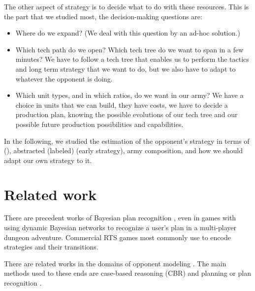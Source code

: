 The other aspect of strategy is to decide what to do with these resources. This is the part that we studied most, the decision-making questions are:
\begin{itemize}
    \item Where do we expand? (We deal with this question by an ad-hoc solution.)
    \item Which tech path do we open? Which tech tree do we want to span in a few minutes? We have to follow a tech tree that enables us to perform the tactics and long term strategy that we want to do, but we also have to adapt to whatever the opponent is doing.
    \item Which unit types, and in which ratios, do we want in our army? We have a choice in units that we can build, they have costs, we have to decide a production plan, knowing the possible evolutions of our tech tree and our possible future production possibilities and capabilities.
\end{itemize}

In the following, we studied the estimation of the opponent's strategy in terms of  (), abstracted (labeled)  (early strategy), army composition, and how we should adapt our own strategy to it.

\section{Related work}


There are precedent works of Bayesian plan recognition \citep{BMPR}, even in games with \citep{BayesianRecog} using dynamic Bayesian networks to recognize a user's plan in a multi-player dungeon adventure. Commercial RTS games most commonly use  \citep{FSM_AIGameProgWisdom2003} to encode strategies and their transitions.

There are related works in the domains of opponent modeling \citep{HsiehS08,schadd2007opponent,Kabanza2010}. The main methods used to these ends are case-based reasoning (CBR) and planning or plan recognition \citep{LTW,CBR_Planning,OntanonCBR,HTNPlanning,Ramirez}.

